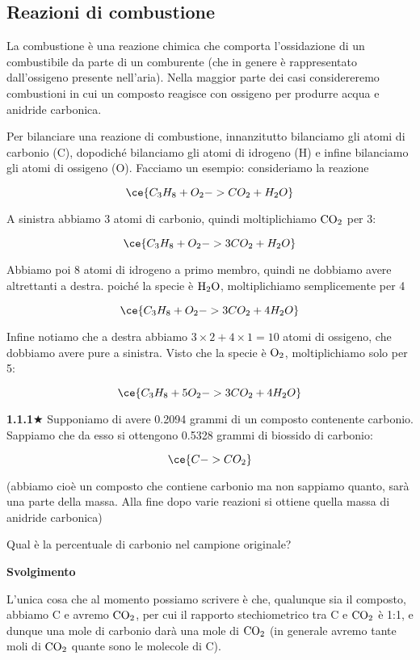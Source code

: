 \subsection{Reazioni di combustione}
La combustione è una reazione chimica che comporta l'ossidazione di un combustibile da parte di un comburente (che in genere è rappresentato dall'ossigeno presente nell'aria). Nella maggior parte dei casi considereremo combustioni in cui un composto reagisce con ossigeno per produrre acqua e anidride carbonica.

Per bilanciare una reazione di combustione, innanzitutto bilanciamo gli atomi di carbonio (C), dopodiché bilanciamo gli atomi di idrogeno (H) e infine bilanciamo gli atomi di ossigeno (O). Facciamo un esempio: consideriamo la reazione

$$\ce{C_3H_8 + O_2 -> CO_2 + H_2O}$$

A sinistra abbiamo 3 atomi di carbonio, quindi moltiplichiamo $\rm CO_2$ per 3:

$$\ce{C_3H_8 + O_2 -> 3CO_2 + H_2O}$$

Abbiamo poi 8 atomi di idrogeno a primo membro, quindi ne dobbiamo avere altrettanti a destra. poiché la specie è $\rm H_2O$, moltiplichiamo semplicemente per 4

$$\ce{C_3H_8 + O_2 -> 3CO_2 + 4H_2O}$$

Infine notiamo che a destra abbiamo $3 \times 2 + 4 \times 1=10$ atomi di ossigeno, che dobbiamo avere pure a sinistra. Visto che la specie è $\rm O_2$, moltiplichiamo solo per 5:

$$\ce{C_3H_8 + 5O_2 -> 3CO_2 + 4H_2O}$$
\newpage

\textbf{1.1.1}$\bigstar$ Supponiamo di avere 0.2094 grammi di un composto contenente carbonio. Sappiamo che da esso si ottengono 0.5328 grammi di biossido di carbonio:

$$\ce{C -> CO_2}$$

(abbiamo cioè un composto che contiene carbonio ma non sappiamo quanto, sarà una parte della massa. Alla fine dopo varie reazioni si ottiene quella massa di anidride carbonica)

Qual è la percentuale di carbonio nel campione originale?

\vspace{0.2cm}\large\textbf{Svolgimento}\normalsize

\vspace{0.2cm}L'unica cosa che al momento possiamo scrivere è che, qualunque sia il composto, abbiamo C e avremo $\rm CO_2$, per cui il rapporto stechiometrico tra C e $\rm CO_2$ è 1:1, e dunque una mole di carbonio darà una mole di $\rm CO_2$ (in generale avremo tante moli di $\rm CO_2$ quante sono le molecole di C).

